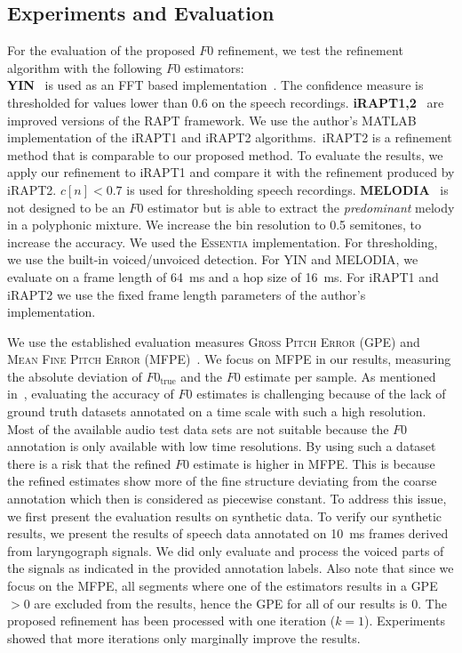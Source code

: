 \subsection{Experiments and Evaluation} %
\label{sec:experiments}

For the evaluation of the proposed $F0$ refinement, we test the refinement algorithm with the following $F0$ estimators:\\
\textbf{YIN}~\cite{decheveigne02} is used as an FFT based implementation~\cite{bogdanov13}. The confidence measure is thresholded for values lower than 0.6 on the speech recordings. \textbf{iRAPT1,2}~\cite{azarov12} are improved versions of the RAPT framework. We use the author's MATLAB implementation of the iRAPT1 and iRAPT2 algorithms.\ iRAPT2 is a refinement method that is comparable to our proposed method. To evaluate the results, we apply our refinement to iRAPT1 and compare it with the refinement produced by iRAPT2. $c[n] < 0.7$ is used for thresholding speech recordings. \textbf{MELODIA}~\cite{salamon12} is not designed to be an $F0$ estimator but is able to extract the \emph{predominant} melody in a polyphonic mixture. We increase the bin resolution to 0.5 semitones, to increase the accuracy. We used the \textsc{Essentia} implementation. For thresholding, we use the built-in voiced/unvoiced detection.
For YIN and MELODIA, we evaluate on a frame length of 64~ms and a hop size of 16~ms. For iRAPT1 and iRAPT2  we use the fixed frame length parameters of the author's implementation.
\par
We use the established evaluation measures \textsc{Gross Pitch Error} (GPE) and \textsc{Mean Fine Pitch Error} (MFPE)~\cite{azarov12}. We focus on MFPE in our results, measuring the absolute deviation of $F0_{\mathrm{true}}$ and the $F0$ estimate per sample.
As mentioned in~\cite{resch07}, evaluating the accuracy of $F0$ estimates is challenging because of the lack of ground truth datasets annotated on a time scale with such a high resolution. Most of the available audio test data sets are not suitable because the $F0$ annotation is only available with low time resolutions. By using such a dataset there is a risk that the refined $F0$ estimate is higher in MFPE. This is because the refined estimates show more of the fine structure deviating from the coarse annotation which then is considered as piecewise constant. To address this issue, we first present the evaluation results on synthetic data. To verify our synthetic results, we present the results of speech data annotated on 10~ms frames derived from laryngograph signals. We did only evaluate and process the voiced parts of the signals as indicated in the provided annotation labels. Also note that since we focus on the MFPE, all segments where one of the estimators results in a GPE $> 0$ are excluded from the results, hence the GPE for all of our results is 0. The proposed refinement has been processed with one iteration ($k=1$). Experiments showed that more iterations only marginally improve the results.

